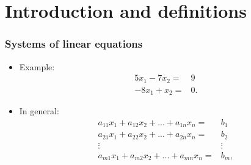 \documentclass[compress]{beamer}
\theoremstyle{definition}
\begin{document}

\begin{frame}
  \tableofcontents  
\end{frame}

\section{Introduction and definitions}
\begin{frame} 
  \frametitle{Systems of linear equations}
  \begin{itemize} 
  \item Example:
    \begin{align*}
      5 x_1 - 7 x_2 = & 9 \\
      -8 x_1 + x_2 = & 0.
    \end{align*}
  \item In general:
    \begin{align*}
      a_{11} x_1 + a_{12} x_2 + ... + a_{1n} x_n = & b_1 \\
      a_{21} x_1 + a_{22} x_2 + ... + a_{2n} x_n = & b_2 \\
      \vdots & \vdots \\
      a_{m1} x_1 + a_{m2} x_2 + ... + a_{mn} x_n = & b_m ,
    \end{align*}
  \end{itemize}
\end{frame}
\end{document}
